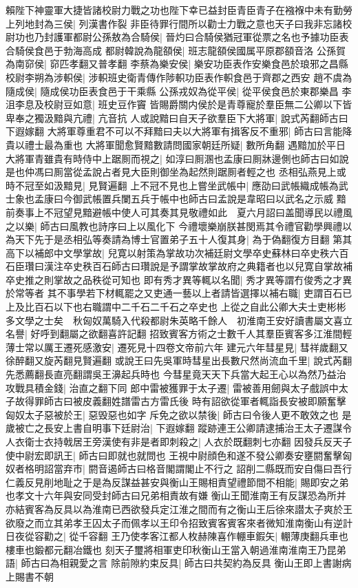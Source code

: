 賴陛下神靈軍大捷皆諸校尉力戰之功也陛下幸已益封臣青臣青子在襁褓中未有勤勞上列地封為三侯|{
	列漢書作裂}
非臣待罪行間所以勸士力戰之意也天子曰我非忘諸校尉功也乃封護軍都尉公孫敖為合騎侯|{
	晉灼曰合騎侯猶冠軍從票之名也予據功臣表合騎侯食邑于勃海高成}
都尉韓說為龍頟侯|{
	班志龍頟侯國属平原郡頟音洛}
公孫賀為南窌侯|{
	窌匹孝翻又普孝翻}
李蔡為樂安侯|{
	樂安功臣表作安樂食邑於琅邪之昌縣}
校尉李朔為涉軹侯|{
	涉軹班史衛青傳作陟軹功臣表作軹食邑于齊郡之西安}
趙不虞為隨成侯|{
	隨成侯功臣表食邑于干乘縣}
公孫戎奴為從平侯|{
	從平侯食邑於東郡樂昌}
李沮李息及校尉豆如意|{
	班史豆作竇}
皆賜爵關内侯於是青尊寵於羣臣無二公卿以下皆卑奉之獨汲黯與亢禮|{
	亢音抗}
人或說黯曰自天子欲羣臣下大將軍|{
	說式芮翻師古曰下遐嫁翻}
大將軍尊重君不可以不拜黯曰夫以大將軍有揖客反不重邪|{
	師古曰言能降貴以禮士最為重也}
大將軍聞愈賢黯數請問國家朝廷所疑|{
	數所角翻}
遇黯加於平日大將軍青雖貴有時侍中上踞厠而視之|{
	如淳曰厠溷也孟康曰厠牀邊側也師古曰如說是也仲馮曰厠當從孟說占者見大臣則御坐為起然則踞厠者輕之也}
丞相弘燕見上或時不冠至如汲黯見|{
	見賢遍翻}
上不冠不見也上嘗坐武帳中|{
	應劭曰武帳織成帳為武士象也孟康曰今御武帳置兵闌五兵于帳中也師古曰孟說是韋昭曰以武名之示威}
黯前奏事上不冠望見黯避帳中使人可其奏其見敬禮如此　夏六月詔曰盖聞導民以禮風之以樂|{
	師古曰風教也詩序曰上以風化下}
今禮壞樂崩朕甚閔焉其令禮官勸學興禮以為天下先于是丞相弘等奏請為博士官置弟子五十人復其身|{
	為于偽翻復方目翻}
第其高下以補郎中文學掌故|{
	兒寛以射策為掌故功次補廷尉文學卒史蘇林曰卒史秩六百石臣瓚曰漢注卒史秩百石師古曰瓚說是予謂掌故掌故府之典籍者也以兒寛自掌故補卒史推之則掌故之品秩從可知也}
即有秀才異等輒以名聞|{
	秀才異等謂冇俊秀之才異於常等者}
其不事學若下材輒罷之又吏通一藝以上者請皆選擇以補右職|{
	吏謂百石已上及比百石以下也右職謂中二千石二千石之卒史也}
上從之自此公卿大夫士吏彬彬多文學之士矣　秋匈奴萬騎入代殺都尉朱英略千餘人　初淮南王安好讀書屬文喜立名譽|{
	好呼到翻屬之欲翻喜許記翻}
招致賓客方術之士數千人其羣臣賓客多江淮間輕薄士常以厲王遷死感激安|{
	遷死見十四卷文帝前六年}
建元六年彗星見|{
	彗祥歲翻又徐醉翻又旋芮翻見賢遍翻}
或說王曰先吳軍時彗星出長數尺然尚流血千里|{
	說式芮翻先悉薦翻長直亮翻謂吳王濞起兵時也}
今彗星竟天天下兵當大起王心以為然乃益治攻戰具積金錢|{
	治直之翻下同}
郎中雷被獲罪于太子遷|{
	雷被善用劒與太子戲誤中太子故得罪師古曰被皮義翻姓譜雷古方雷氏後}
時有詔欲從軍者輒詣長安被即願奮擊匈奴太子惡被於王|{
	惡毁惡也如字}
斥免之欲以禁後|{
	師古曰令後人更不敢效之也}
是歲被亡之長安上書自明事下廷尉治|{
	下遐嫁翻}
蹤跡連王公卿請逮捕治王太子遷謀令人衣衛士衣持戟居王旁漢使有非是者即刺殺之|{
	人衣於既翻刺七亦翻}
因發兵反天子使中尉宏即訊王|{
	師古曰即就也就問也}
王視中尉顔色和遂不發公卿奏安壅閼奮擊匈奴者格明詔當弃市|{
	閼音遏師古曰格音閣謂閣止不行之}
詔削二縣既而安自傷曰吾行仁義反見削地耻之于是為反謀益甚安與衡山王賜相責望禮節間不相能|{
	賜即安之弟也孝文十六年與安同受封師古曰兄弟相責故有嫌}
衡山王聞淮南王有反謀恐為所并亦結賓客為反具以為淮南已西欲發兵定江淮之間而有之衡山王后徐來譛太子爽於王欲廢之而立其弟孝王囚太子而佩孝以王印令招致賓客賓客來者微知淮南衡山有逆計日夜從容勸之|{
	從千容翻}
王乃使孝客江都人枚赫陳喜作輣車鍜矢|{
	輣薄庚翻兵車也樓車也鍛都元翻冶鐵也}
刻天子璽將相軍吏印秋衡山王當入朝過淮南淮南王乃昆弟語|{
	師古曰為相親愛之言}
除前隙約束反具|{
	師古曰共契約為反具}
衡山王即上書謝病上賜書不朝

